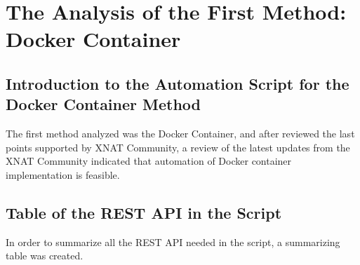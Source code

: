 \chapter{The Analysis of the First Method: Docker Container}

\section{Introduction to the Automation Script for the Docker Container Method}
The first method analyzed was the Docker Container, and after reviewed the last points supported by XNAT Community, a review of the latest updates from the XNAT Community indicated that automation of Docker container implementation is feasible.

\section{Table of the REST API in the Script}

In order to summarize all the REST API needed in the script, a summarizing table was created.


